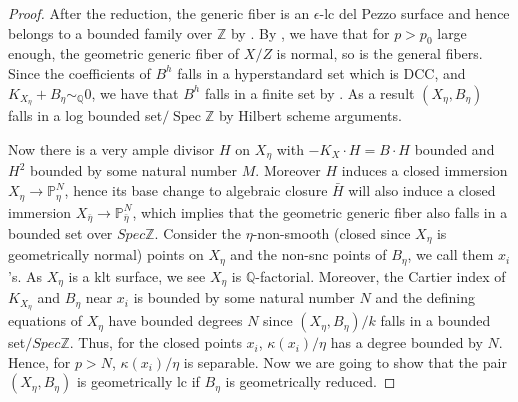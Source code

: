 \documentclass[letterpaper,reqno,12pt]{amsart}
\DeclareMathOperator{\Spec}{Spec}
\numberwithin{equation}{section}
\theoremstyle{plain}
\begin{document}
\begin{proof}
    After the reduction, the generic fiber is an $\epsilon$-lc del Pezzo surface and hence belongs to a bounded family over $\mathbb Z$ by \cite{bernasconi2024boundinggeometricallyintegraldel}. By , we have that for $p>p_0$ large enough, the geometric generic fiber of $X/Z$ is normal, so is the general fibers. Since the coefficients of $B^h$ falls in a hyperstandard  set which is DCC, and $K_{X_\eta}+B_\eta\sim_{\mathbb Q} 0$, we have that $B^h$ falls in a finite set by . As a result  $(X_\eta,B_\eta)$ falls in a log bounded set$/\Spec \mathbb Z$ by Hilbert scheme arguments.

    Now there is a very ample divisor $H$ on $X_\eta$ with $-K_X\cdot H=B\cdot H$ bounded and $H^2$ bounded by some natural number $M$. Moreover $H$ induces a closed immersion $X_\eta\to \mathbb P^N_\eta$, hence its base change to algebraic closure $\bar H$ will also induce a closed immersion $X_{\bar\eta}\to \mathbb P^N_{\bar\eta}$, which implies that the geometric generic fiber also falls in a bounded set over $Spec\mathbb Z$. Consider the $\eta$-non-smooth (closed since $X_\eta$ is geometrically normal) points on $X_\eta$ and the non-snc points of $B_\eta$, we call them $x_i$'s. As $X_\eta$ is a klt surface, we see $X_\eta$ is ${\mathbb Q}$-factorial. Moreover, the Cartier index of $K_{X_\eta}$ and $B_\eta$ near $x_i$ is bounded by some natural number $N$ and the defining equations of $X_\eta$ have bounded degrees $N$ since $(X_\eta,B_\eta)/k$ falls in a bounded set$/Spec\mathbb Z$. Thus, for the closed points $x_i$, $\kappa(x_i)/\eta$ has a degree bounded by $N$. Hence, for $p>N$, $\kappa(x_i)/\eta$ is separable. Now we are going to show that the pair $(X_\eta,B_\eta)$ is geometrically lc if $B_\eta$ is geometrically reduced.


\end{proof}
\end{document}
